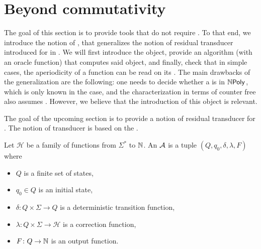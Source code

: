 \section{Beyond commutativity}
\label{beyond-commutative:sec}

The goal of this section is to provide tools that do not require
 . To that end, we introduce
the notion of , that generalizes the notion of
residual transducer introduced for  in
\cite{LOPEZ23b}. We will first introduce the object, provide an algorithm (with
an oracle function) that computes said object, and finally, check that in
simple cases, the aperiodicity of a function can be read on its
. The main drawbacks of the generalization are the
following: one needs to decide whether a  is in
$\NPoly$, which is only known in the  case, and the
characterization in terms of counter free also assumes .
However, we believe that the introduction of this object is relevant.


The goal of the upcoming section is to provide a notion of residual transducer
for  . The notion of
transducer is based on the  \cite{EHB99}.

\begin{definition}
    Let $\mathcal{H}$ be a family of functions
    from $\Sigma^*$ to $\mathbb{N}$.
    An  $\mathcal{A}$ is
    a tuple $(Q, q_0, \delta, \lambda, F)$ where
    \begin{itemize}
        \item $Q$ is a finite set of states,
        \item $q_0 \in Q$ is an initial state,
        \item $\delta \colon Q \times \Sigma \to Q$
            is a deterministic transition function,
        \item $\lambda \colon Q \times \Sigma \to \mathcal{H}$
            is a correction function,
        \item $F \colon Q \to \mathbb{N}$ is an output function.
    \end{itemize}
\end{definition}


